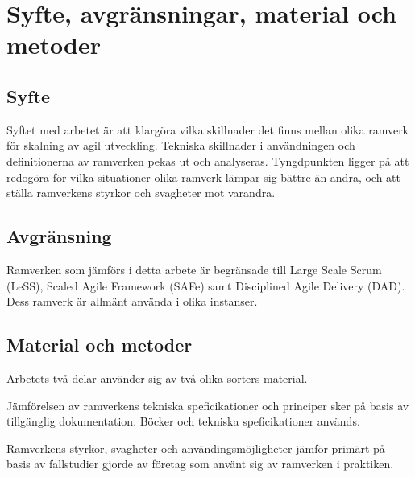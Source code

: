 	
\newpage

\section{Syfte, avgränsningar, material och metoder}


\subsection{Syfte}

Syftet med arbetet är att klargöra vilka skillnader det finns mellan olika ramverk för skalning av agil utveckling. Tekniska skillnader i användningen och definitionerna av ramverken pekas ut och analyseras.
Tyngdpunkten ligger på att redogöra för vilka situationer olika ramverk lämpar sig bättre än andra, och att ställa ramverkens styrkor och svagheter mot varandra.



\subsection{Avgränsning}

Ramverken som jämförs i detta arbete är begränsade till Large Scale Scrum (LeSS), Scaled Agile Framework (SAFe) samt Disciplined Agile Delivery (DAD).
Dess ramverk är allmänt använda i olika instanser.




\subsection{Material och metoder}
Arbetets två delar använder sig av två olika sorters material.

Jämförelsen av ramverkens tekniska speficikationer och principer sker på basis av tillgänglig dokumentation. Böcker och tekniska speficikationer används.


Ramverkens styrkor, svagheter och användingsmöjligheter jämför primärt på basis av fallstudier gjorde av företag som använt sig av ramverken i praktiken.



